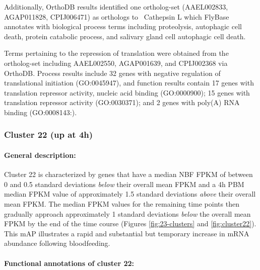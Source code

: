 %
Additionally, OrthoDB results identified one ortholog-set (AAEL002833, AGAP011828, CPIJ006471) as orthologs to \Dm\ Cathepsin L which FlyBase annotates with biological process terms including proteolysis, autophagic cell death, protein catabolic process, and salivary gland cell autophagic cell death.
%

Terms pertaining to the repression of translation were obtained from the ortholog-set including AAEL002550, AGAP001639, and CPIJ002368 via OrthoDB.
%
Process results include 32 genes with negative regulation of translational initiation (GO:0045947), and function results contain 17 genes with translation repressor activity, nucleic acid binding (GO:0000900); 15 genes with translation repressor activity (GO:0030371); and 2 genes with  poly(A) RNA binding (GO:0008143:).



\subsubsection{Cluster 22 (up at 4h)}

\paragraph*{General description:}

Cluster 22 is characterized by genes that have a median \gls{NBF} \gls{FPKM} of between 0 and 0.5 standard deviations \textit{below} their overall mean \gls{FPKM} and a 4h \gls{PBM} median \gls{FPKM} value of approximately 1.5 standard deviations \textit{above} their overall mean \gls{FPKM}. The median \gls{FPKM} values for the remaining time points then gradually approach approximately 1 standard deviations \textit{below} the overall mean \gls{FPKM} by the end of the time course (Figures \ref{fig:23-clusters} and \ref{fig:cluster22}).
%
This \gls{mAP} illustrates a rapid and substantial but temporary increase in mRNA abundance following bloodfeeding.
%



\paragraph*{Functional annotations of cluster 22:}




